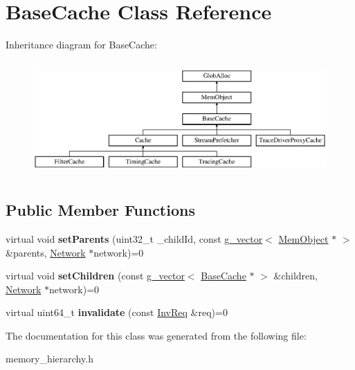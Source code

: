 \hypertarget{classBaseCache}{\section{Base\-Cache Class Reference}
\label{classBaseCache}
}
Inheritance diagram for Base\-Cache\-:\begin{figure}[H]
\begin{center}
\leavevmode
\includegraphics[height=4.402516cm]{classBaseCache}
\end{center}
\end{figure}
\subsection*{Public Member Functions}
\begin{DoxyCompactItemize}
\item 
\hypertarget{classBaseCache_a869ed0b4434d75697a46e77279a89c37}{virtual void {\bfseries set\-Parents} (uint32\-\_\-t \-\_\-child\-Id, const \hyperlink{classg__vector}{g\-\_\-vector}$<$ \hyperlink{classMemObject}{Mem\-Object} $\ast$ $>$ \&parents, \hyperlink{classNetwork}{Network} $\ast$network)=0}\label{classBaseCache_a869ed0b4434d75697a46e77279a89c37}

\item 
\hypertarget{classBaseCache_a05e2d3cfe83d549065360b21bdaabea3}{virtual void {\bfseries set\-Children} (const \hyperlink{classg__vector}{g\-\_\-vector}$<$ \hyperlink{classBaseCache}{Base\-Cache} $\ast$ $>$ \&children, \hyperlink{classNetwork}{Network} $\ast$network)=0}\label{classBaseCache_a05e2d3cfe83d549065360b21bdaabea3}

\item 
\hypertarget{classBaseCache_adee591deb418ec0b938c20cfc40d335c}{virtual uint64\-\_\-t {\bfseries invalidate} (const \hyperlink{structInvReq}{Inv\-Req} \&req)=0}\label{classBaseCache_adee591deb418ec0b938c20cfc40d335c}

\end{DoxyCompactItemize}


The documentation for this class was generated from the following file\-:\begin{DoxyCompactItemize}
\item 
memory\-\_\-hierarchy.\-h\end{DoxyCompactItemize}
